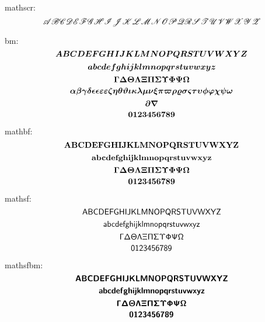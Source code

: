 \documentclass{article}
\begin{document}
mathscr:
\[ \scA \scB \scC \scD \scE \scF \scG \scH \scI \scJ \scK \scL \scM \scN \scO \scP \scQ \scR \scS \scT \scU \scV \scW \scX \scY \scZ \]

bm:
\[ \bmA \bmB \bmC \bmD \bmE \bmF \bmG \bmH \bmI \bmJ \bmK \bmL \bmM \bmN \bmO \bmP \bmQ \bmR \bmS \bmT \bmU \bmV \bmW \bmX \bmY \bmZ \]
\[ \bmaa \bmbb \bmcc \bmdd \bmee \bmff \bmgg \bmhh \bmii \bmjj \bmkk \bmll \bmmm \bmnn \bmoo \bmpp \bmqq \bmrr \bmss \bmtt \bmuu \bmvv \bmww \bmxx \bmyy \bmzz \]
\[ \bmGamma \bmDelta \bmTheta \bmLambda \bmXi \bmPi \bmSigma \bmUpsilon \bmPhi \bmPsi \bmOmega \]
\[ \bmalpha \bmbeta \bmgamma \bmdelta \bmepsilon \bmeps \bmvarepsilon \bmveps \bmzeta \bmeta \bmtheta \bmvartheta \bmiota \bmkappa \bmlambda \bmmu \bmnu \bmxi \bmpi \bmvarpi \bmrho \bmvarrho \bmsigma \bmvarsigma \bmtau \bmupsilon \bmphi \bmvarphi \bmchi \bmpsi \bmomega \]
\[ \bmpartial \bmnabla \]
\[ \bmzro \bmone \bmtwo \bmthr \bmfor \bmfiv \bmsix \bmsev \bmeit \bmnin \]

mathbf:
\[ \bfA \bfB \bfC \bfD \bfE \bfF \bfG \bfH \bfI \bfJ \bfK \bfL \bfM \bfN \bfO \bfP \bfQ \bfR \bfS \bfT \bfU \bfV \bfW \bfX \bfY \bfZ \]
\[ \bfaa \bfbb \bfcc \bfdd \bfee \bfff \bfgg \bfhh \bfii \bfjj \bfkk \bfll \bfmm \bfnn \bfoo \bfpp \bfqq \bfrr \bfss \bftt \bfuu \bfvv \bfww \bfxx \bfyy \bfzz \]
\[ \bfGamma \bfDelta \bfTheta \bfLambda \bfXi \bfPi \bfSigma \bfUpsilon \bfPhi \bfPsi \bfOmega \]
\[ \bfzro \bfone \bftwo \bfthr \bffor \bffiv \bfsix \bfsev \bfeit \bfnin \]

mathsf:
\[ \sfA \sfB \sfC \sfD \sfE \sfF \sfG \sfH \sfI \sfJ \sfK \sfL \sfM \sfN \sfO \sfP \sfQ \sfR \sfS \sfT \sfU \sfV \sfW \sfX \sfY \sfZ \]
\[ \sfaa \sfbb \sfcc \sfdd \sfee \sfff \sfgg \sfhh \sfii \sfjj \sfkk \sfll \sfmm \sfnn \sfoo \sfpp \sfqq \sfrr \sfss \sftt \sfuu \sfvv \sfww \sfxx \sfyy \sfzz \]
\[ \sfGamma \sfDelta \sfTheta \sfLambda \sfXi \sfPi \sfSigma \sfUpsilon \sfPhi \sfPsi \sfOmega \]
\[ \sfzro \sfone \sftwo \sfthr \sffor \sffiv \sfsix \sfsev \sfeit \sfnin \]

mathsfbm:
\[ \sfbA \sfbB \sfbC \sfbD \sfbE \sfbF \sfbG \sfbH \sfbI \sfbJ \sfbK \sfbL \sfbM \sfbN \sfbO \sfbP \sfbQ \sfbR \sfbS \sfbT \sfbU \sfbV \sfbW \sfbX \sfbY \sfbZ \]
\[ \sfbaa \sfbbb \sfbcc \sfbdd \sfbee \sfbff \sfbgg \sfbhh \sfbii \sfbjj \sfbkk \sfbll \sfbmm \sfbnn \sfboo \sfbpp \sfbqq \sfbrr \sfbss \sfbtt \sfbuu \sfbvv \sfbww \sfbxx \sfbyy \sfbzz \]
\[ \sfbGamma \sfbDelta \sfbTheta \sfbLambda \sfbXi \sfbPi \sfbSigma \sfbUpsilon \sfbPhi \sfbPsi \sfbOmega \]
\[ \sfbzro \sfbone \sfbtwo \sfbthr \sfbfor \sfbfiv \sfbsix \sfbsev \sfbeit \sfbnin \]
\end{document}
